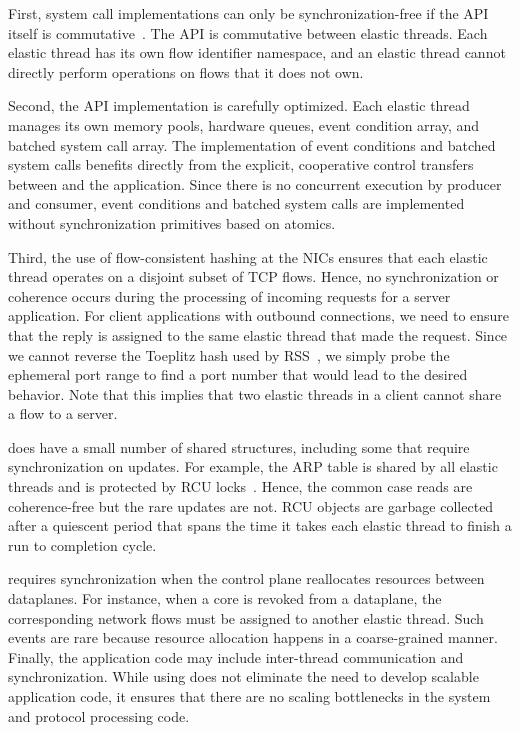 First, system call implementations can only be synchronization-free if
the API itself is
commutative~\cite{DBLP:conf/sosp/ClementsKZMK13}. The \ix API is
commutative between elastic threads. Each elastic thread has its own
flow identifier namespace, and an elastic thread cannot directly perform
operations on flows that it does not own.

Second, the API implementation is carefully optimized.  Each elastic
thread manages its own memory pools, hardware queues, event condition
array, and batched system call array. The implementation of event conditions and
batched system calls benefits directly from the explicit, cooperative
control transfers between \ix and the application.
Since there is no concurrent execution by producer and
consumer, event conditions and batched system calls are implemented
without synchronization primitives based on atomics.

Third, the use of flow-consistent hashing at the NICs ensures that
each elastic thread operates on a disjoint subset of TCP
flows. Hence, no synchronization or coherence occurs during the
processing of incoming requests for a server application. For client
applications with outbound connections, we need to ensure that the
reply is assigned to the same elastic thread that made the
request. Since we cannot reverse the Toeplitz hash used by
RSS~\cite{url:rss}, we simply probe the ephemeral port range to find a
port number that would lead to the desired behavior. Note that this
implies that two elastic threads in a client cannot share a flow to a
server.

\ix does have a small number of shared structures, including some that
require synchronization on updates.  For example, the ARP table is
shared by all elastic threads and is protected by RCU
locks~\cite{mckenney1998read}. Hence, the common case reads are
coherence-free but the rare updates are not.
RCU objects are garbage collected after a quiescent period that
spans the time it takes each elastic thread to finish a run to
completion cycle.
%

\ix requires synchronization when the control plane reallocates
resources between dataplanes.  For instance, when a core is revoked
from a dataplane, the corresponding network flows must be assigned
to another elastic thread. Such events are rare because resource
allocation happens in a coarse-grained manner. Finally, the application
code may include inter-thread communication and synchronization. While
using \ix does not eliminate the need to develop scalable application
code, it ensures that there are no scaling bottlenecks in the system
and protocol processing code.

